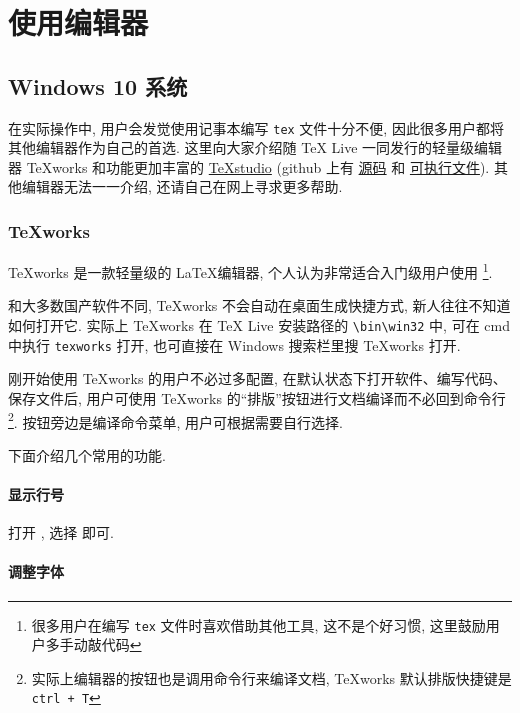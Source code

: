 
\chapter{使用编辑器}

\section{Windows 10 系统}

在实际操作中, 用户会发觉使用记事本编写 \texttt{tex} 文件十分不便,
因此很多用户都将其他编辑器作为自己的首选.
这里向大家介绍随 \TeX{} Live 一同发行的轻量级编辑器 \TeX works
和功能更加丰富的
\href{http://texstudio.sourceforge.net/}{\TeX studio}
(github 上有%
\href{https://github.com/texstudio-org/texstudio}{源码}%
和%
\href{https://github.com/texstudio-org/texstudio/releases}{可执行文件}).
其他编辑器无法一一介绍, 还请自己在网上寻求更多帮助. 

\subsection{\TeX works}

\TeX works 是一款轻量级的 \LaTeX 编辑器, 个人认为非常适合入门级用户使用%
\footnote{很多用户在编写 \texttt{tex} 文件时喜欢借助其他工具,
这不是个好习惯, 这里鼓励用户多手动敲代码}. 

和大多数国产软件不同, \TeX works 不会自动在桌面生成快捷方式,
新人往往不知道如何打开它. 
实际上 \TeX works 在 \TeX{} Live 安装路径的
\texttt{\textbackslash bin\textbackslash win32} 中,
可在 \textsf{cmd} 中执行 \texttt{texworks} 打开,
也可直接在 Windows 搜索栏里搜 \TeX works 打开. 

刚开始使用 \TeX works 的用户不必过多配置,
在默认状态下打开软件、编写代码、保存文件后,
用户可使用 \TeX works 的“排版”按钮进行文档编译而不必回到命令行%
\footnote{实际上编辑器的按钮也是调用命令行来编译文档,
\TeX works 默认排版快捷键是 \texttt{ctrl + T}}. 
按钮旁边是编译命令菜单, 用户可根据需要自行选择. 

下面介绍几个常用的功能. 

\subsubsection{显示行号}

打开 , 选择  即可. 

\subsubsection{调整字体}

